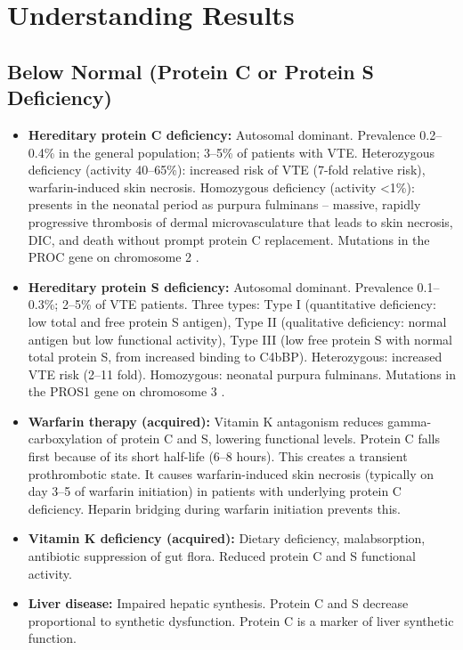 \section*{Understanding Results}

\subsection*{Below Normal (Protein C or Protein S Deficiency)}
\begin{itemize}
  \item \textbf{Hereditary protein C deficiency:} Autosomal dominant. Prevalence 0.2--0.4\% in the general population; 3--5\% of patients with VTE. Heterozygous deficiency (activity 40--65\%): increased risk of VTE (7-fold relative risk), warfarin-induced skin necrosis. Homozygous deficiency (activity <1\%): presents in the neonatal period as purpura fulminans -- massive, rapidly progressive thrombosis of dermal microvasculature that leads to skin necrosis, DIC, and death without prompt protein C replacement. Mutations in the PROC gene on chromosome 2 \cite{goldenberg2008protein}.
  \item \textbf{Hereditary protein S deficiency:} Autosomal dominant. Prevalence 0.1--0.3\%; 2--5\% of VTE patients. Three types: Type I (quantitative deficiency: low total and free protein S antigen), Type II (qualitative deficiency: normal antigen but low functional activity), Type III (low free protein S with normal total protein S, from increased binding to C4bBP). Heterozygous: increased VTE risk (2--11 fold). Homozygous: neonatal purpura fulminans. Mutations in the PROS1 gene on chromosome 3 \cite{tenkate2008protein}.
  \item \textbf{Warfarin therapy (acquired):} Vitamin K antagonism reduces gamma-carboxylation of protein C and S, lowering functional levels. Protein C falls first because of its short half-life (6--8 hours). This creates a transient prothrombotic state. It causes warfarin-induced skin necrosis (typically on day 3--5 of warfarin initiation) in patients with underlying protein C deficiency. Heparin bridging during warfarin initiation prevents this.
  \item \textbf{Vitamin K deficiency (acquired):} Dietary deficiency, malabsorption, antibiotic suppression of gut flora. Reduced protein C and S functional activity.
  \item \textbf{Liver disease:} Impaired hepatic synthesis. Protein C and S decrease proportional to synthetic dysfunction. Protein C is a marker of liver synthetic function.

\end{itemize}
